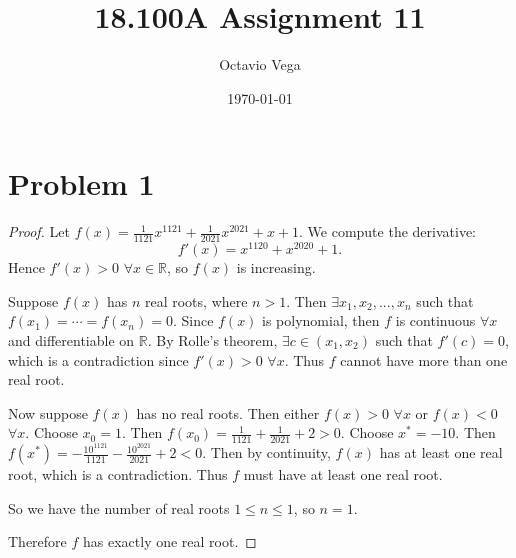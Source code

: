 \documentclass{article}
\title{18.100A Assignment 11}
\author{Octavio Vega}
\date\today
\newcommand{\R}{\mathbb{R}} %
\begin{document}
\maketitle
	
\section*{Problem 1}
\begin{proof}
	Let $f(x) = \frac{1}{1121}x^{1121} + \frac{1}{2021}x^{2021} + x + 1$. We compute the derivative:
	\begin{equation}
		f'(x) = x^{1120} + x^{2020} + 1.
	\end{equation}
	Hence $f'(x) > 0$ $\forall x \in \R$, so $f(x)$ is increasing.
	
	Suppose $f(x)$ has $n$ real roots, where $n > 1$. Then $\exists x_1, x_2, ..., x_n$ such that $f(x_1) = \cdots = f(x_n) = 0$. Since $f(x)$ is polynomial, then $f$ is continuous $\forall x$ and differentiable on $\R$. By Rolle's theorem, $\exists c \in (x_1, x_2)$ such that $f'(c) = 0$, which is a contradiction since $f'(x) > 0$ $\forall x$. Thus $f$ cannot have more than one real root.
	
	Now suppose $f(x)$ has no real roots. Then either $f(x) > 0$ $\forall x$ or $f(x) < 0$ $\forall x$. Choose $x_0 = 1$. Then $f(x_0) = \frac{1}{1121} + \frac{1}{2021} + 2 > 0$. Choose $x^* = -10$. Then $f(x^*) = -\frac{10^{1121}}{1121} - \frac{10^{2021}}{2021} + 2 < 0$.
	Then by continuity, $f(x)$ has at least one real root, which is a contradiction. Thus $f$ must have at least one real root.
	
	So we have the number of real roots $1 \leq n \leq 1$, so $n = 1$.
	
	Therefore $f$ has exactly one real root.
\end{proof}
\end{document}
